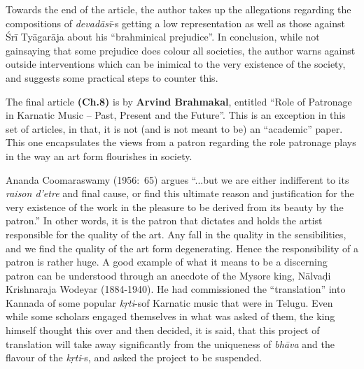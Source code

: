 \vspace{-.1cm}

Towards the end of the article, the author takes up the allegations regarding the compositions of \textit{devadāsī}-s getting a low representation as well as those against Śrī Tyāgarāja about his “brahminical prejudice”. In conclusion, while not gainsaying that some prejudice does colour all societies, the author warns against outside interventions which can be inimical to the very existence of the society, and suggests some practical steps to counter this.

\vspace{-.1cm}

The final article \textbf{(Ch.8)} is by \textbf{Arvind Brahmakal}, entitled “Role of Patronage in Karnatic Music – Past, Present and the Future”. This is an exception in this set of articles, in that, it is not (and is not meant to be) an “academic” paper. This one encapsulates the views from a patron regarding the role patronage plays in the way an art form flourishes in society.

Ananda Coomaraswamy (1956:~65) argues “...but we are either indifferent to its \textit{raison d'etre} and final cause, or find this ultimate reason and justification for the very existence of the work in the pleasure to be derived from its beauty by the patron.” In other words, it is the patron that dictates and holds the artist responsible for the quality of the art. Any fall in the quality in the sensibilities, and we find the quality of the art form degenerating. Hence the responsibility of a patron is rather huge. A good example of what it means to be a discerning patron can be understood through an anecdote of the Mysore king, Nālvaḍi Krishnaraja Wodeyar (1884-1940). He had commissioned the “translation” into Kannada of some popular \textit{kṛti}-s\break of Karnatic music that were in Telugu. Even while some scholars engaged themselves in what was asked of them, the king himself thought this over and then decided, it is said, that this project of translation will take away significantly from the uniqueness of \textit{bhāva} and the flavour of the \textit{kṛti}-s, and asked the project to be suspended.

